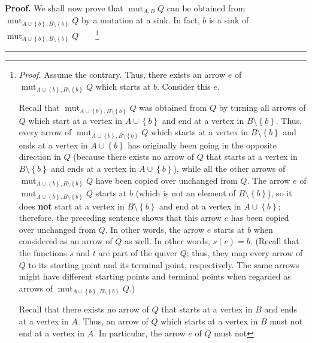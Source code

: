 \documentclass[numbers=enddot,12pt,final,onecolumn,notitlepage]{scrartcl}%
\numberwithin{exer}{section}
\theoremstyle{definition}
\newenvironment{proof}[1][Proof]{\noindent\textbf{#1.} }{\ \rule{0.5em}{0.5em}}
\begin{document}
\begin{proof}
We shall now prove that $\operatorname*{mut}\nolimits_{A,B}Q$ can be obtained
from $\operatorname*{mut}\nolimits_{A\cup\left\{  b\right\}  ,B\setminus
\left\{  b\right\}  }Q$ by a mutation at a sink. In fact, $b$ is a sink of
$\operatorname*{mut}\nolimits_{A\cup\left\{  b\right\}  ,B\setminus\left\{
b\right\}  }Q$\ \ \ \ \footnote{\textit{Proof.} Assume the contrary. Thus,
there exists an arrow $e$ of $\operatorname*{mut}\nolimits_{A\cup\left\{
b\right\}  ,B\setminus\left\{  b\right\}  }Q$ which starts at $b$. Consider
this $e$.
\par
Recall that $\operatorname*{mut}\nolimits_{A\cup\left\{  b\right\}
,B\setminus\left\{  b\right\}  }Q$ was obtained from $Q$ by turning all arrows
of $Q$ which start at a vertex in $A\cup\left\{  b\right\}  $ and end at a
vertex in $B\setminus\left\{  b\right\}  $. Thus, every arrow of
$\operatorname*{mut}\nolimits_{A\cup\left\{  b\right\}  ,B\setminus\left\{
b\right\}  }Q$ which starts at a vertex in $B\setminus\left\{  b\right\}  $
and ends at a vertex in $A\cup\left\{  b\right\}  $ has originally been going
in the opposite direction in $Q$ (because there exists no arrow of $Q$ that
starts at a vertex in $B\setminus\left\{  b\right\}  $ and ends at a vertex in
$A\cup\left\{  b\right\}  $), while all the other arrows of
$\operatorname*{mut}\nolimits_{A\cup\left\{  b\right\}  ,B\setminus\left\{
b\right\}  }Q$ have been copied over unchanged from $Q$. The arrow $e$ of
$\operatorname*{mut}\nolimits_{A\cup\left\{  b\right\}  ,B\setminus\left\{
b\right\}  }Q$ starts at $b$ (which is not an element of $B\setminus\left\{
b\right\}  $), so it does \textbf{not} start at a vertex in $B\setminus
\left\{  b\right\}  $ and end at a vertex in $A\cup\left\{  b\right\}  $;
therefore, the preceding sentence shows that this arrow $e$ has been copied
over unchanged from $Q$. In other words, the arrow $e$ starts at $b$ when
considered as an arrow of $Q$ as well. In other words, $s\left(  e\right)
=b$. (Recall that the functions $s$ and $t$ are part of the quiver $Q$; thus,
they map every arrow of $Q$ to its starting point and its terminal point,
respectively. The same arrows might have different starting points and
terminal points when regarded as arrows of $\operatorname*{mut}%
\nolimits_{A\cup\left\{  b\right\}  ,B\setminus\left\{  b\right\}  }Q$.)
\par
Recall that there exists no arrow of $Q$ that starts at a vertex in $B$ and
ends at a vertex in $A$. Thus, an arrow of $Q$ which starts at a vertex in $B$
must not end at a vertex in $A$. In particular, the arrow $e$ of $Q$ must not
}
\end{proof}
\end{document}
